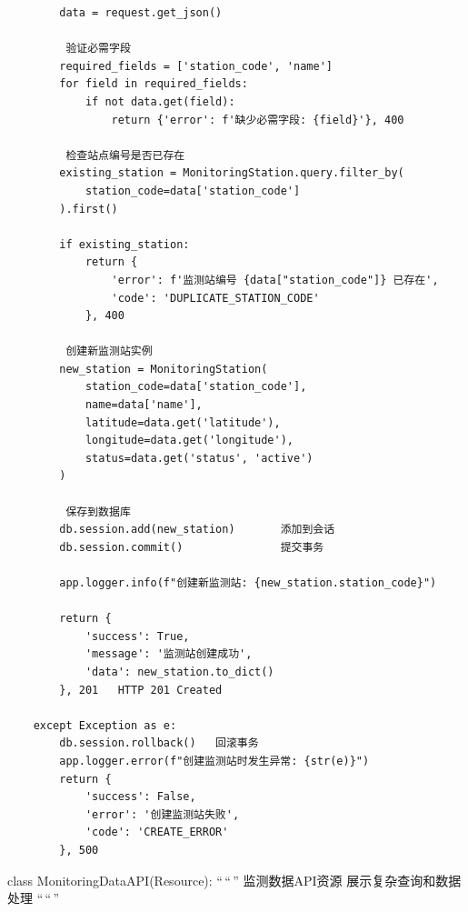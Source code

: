 \begin{verbatim}
        data = request.get_json()
        
         验证必需字段
        required_fields = ['station_code', 'name']
        for field in required_fields:
            if not data.get(field):
                return {'error': f'缺少必需字段: {field}'}, 400
        
         检查站点编号是否已存在
        existing_station = MonitoringStation.query.filter_by(
            station_code=data['station_code']
        ).first()
        
        if existing_station:
            return {
                'error': f'监测站编号 {data["station_code"]} 已存在',
                'code': 'DUPLICATE_STATION_CODE'
            }, 400
        
         创建新监测站实例
        new_station = MonitoringStation(
            station_code=data['station_code'],
            name=data['name'],
            latitude=data.get('latitude'),
            longitude=data.get('longitude'),
            status=data.get('status', 'active')
        )
        
         保存到数据库
        db.session.add(new_station)       添加到会话
        db.session.commit()               提交事务
        
        app.logger.info(f"创建新监测站: {new_station.station_code}")
        
        return {
            'success': True,
            'message': '监测站创建成功',
            'data': new_station.to_dict()
        }, 201   HTTP 201 Created
        
    except Exception as e:
        db.session.rollback()   回滚事务
        app.logger.error(f"创建监测站时发生异常: {str(e)}")
        return {
            'success': False,
            'error': '创建监测站失败',
            'code': 'CREATE_ERROR'
        }, 500
\end{verbatim}

class MonitoringDataAPI(Resource): ``\,``\,'' 监测数据API资源 展示复杂查询和数据处理 ``\,``\,''

